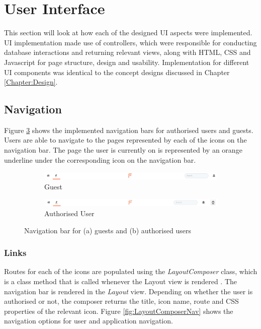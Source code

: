 \section{User Interface}
This section will look at how each of the designed UI aspects were implemented. UI implementation made use of controllers, which were responsible for conducting database interactions and returning relevant views, along with HTML, CSS and Javascript for page structure, design and usability. Implementation for different UI components was identical to the concept designs discussed in Chapter \ref{Chapter:Design}.

\subsection{Navigation}
Figure \ref{fig:NavImplementation} shows the implemented navigation bars for authorised users and guests. Users are able to navigate to the pages represented by each of the icons on the navigation bar. The page the user is currently on is represented by an orange underline under the corresponding icon on the navigation bar.

\begin{figure}[H]
	\centering
	\begin{subfigure}{1\linewidth}
		\includegraphics[width=1\textwidth]{Images/Design/nav-unauthorised}
		\caption{Guest}
		\label{fig:NavUnauth}
	\end{subfigure}
	\begin{subfigure}{1\linewidth}
		\includegraphics[width=1\textwidth]{Images/Design/nav-authorised}
		\caption{Authorised User}
		\label{fig:NavAuth}
	\end{subfigure}
	\caption{Navigation bar for (a) guests and (b) authorised users}
	\label{fig:NavImplementation}
\end{figure}

\subsubsection{Links}
Routes for each of the icons are populated using the \textit{LayoutComposer} class, which is a class method that is called whenever the Layout view is rendered \cite{Laravel:Views}. The navigation bar is rendered in the \emph{Layout} view. Depending on whether the user is authorised or not, the composer returns the title, icon name, route and CSS properties of the relevant icon. Figure \ref{fig:LayoutComposerNav} shows the navigation options for user and application navigation.

